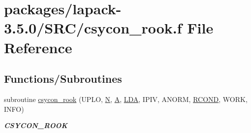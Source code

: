 \hypertarget{csycon__rook_8f}{}\section{packages/lapack-\/3.5.0/\+S\+R\+C/csycon\+\_\+rook.f File Reference}
\label{csycon__rook_8f}
\subsection*{Functions/\+Subroutines}
\begin{DoxyCompactItemize}
\item 
subroutine \hyperlink{group__complexSYcomputational_ga2b5b978f7ae256e0174ce1df690aa5f1}{csycon\+\_\+rook} (U\+P\+L\+O, \hyperlink{polmisc_8c_a0240ac851181b84ac374872dc5434ee4}{N}, \hyperlink{classA}{A}, \hyperlink{example__user_8c_ae946da542ce0db94dced19b2ecefd1aa}{L\+D\+A}, I\+P\+I\+V, A\+N\+O\+R\+M, \hyperlink{superlu__enum__consts_8h_af00a42ecad444bbda75cde1b64bd7e72a9b5c151728d8512307565994c89919d5}{R\+C\+O\+N\+D}, W\+O\+R\+K, I\+N\+F\+O)
\begin{DoxyCompactList}\small\item\em {\bfseries C\+S\+Y\+C\+O\+N\+\_\+\+R\+O\+O\+K} \end{DoxyCompactList}\end{DoxyCompactItemize}
